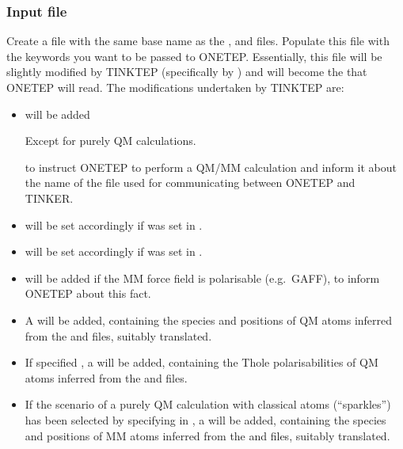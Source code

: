 \documentclass[letterpaper,10pt,english]{sphinxmanual}
\begin{document}
\subsubsection{Input  file}
\label{\detokenize{tinktep:input-dat-template-file}}
Create a  file with the same base name as the ,
 and  files. Populate this file with the keywords you
want to be passed to ONETEP. Essentially, this file will be slightly
modified by TINKTEP (specifically by ) and will become
the  that ONETEP will read. The modifications undertaken by
TINKTEP are:
\begin{itemize}
\item {} 
 will be added %
\begin{footnote}[1]\sphinxAtStartFootnote
Except for purely QM calculations.
%
\end{footnote} to instruct ONETEP to
perform a QM/MM calculation and inform it about the name of the file
used for communicating between ONETEP and TINKER.

\item {} 
 will be set accordingly if  was
set in .

\item {} 
 will be set accordingly if  was
set in .

\item {} 
 will be added if the MM force field is
 polarisable (e.g. GAFF), to inform ONETEP about this fact.

\item {} 
A  will be added, containing the species and
positions of QM atoms inferred from the  and  files,
suitably translated.

\item {} 
If  specified , a
 will be added, containing the Thole
polarisabilities of QM atoms inferred from the  and 
files.

\item {} 
If the scenario of a purely QM calculation with classical atoms
(“sparkles”) has been selected by specifying  in
, a  will be added,
containing the species and positions of MM atoms inferred from the
 and  files, suitably translated.


\end{itemize}
\end{document}
